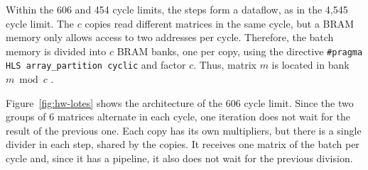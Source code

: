 Within the 606 and 454 cycle limits, the steps form a dataflow, as in the 4,545 cycle limit. The $c$ copies read different matrices in the same cycle, but a BRAM memory only allows access to two addresses per cycle. Therefore, the batch memory is divided into $c$ BRAM banks, one per copy, using the directive \texttt{\#pragma HLS array\_partition cyclic} and factor $c$. Thus, matrix $m$ is located in bank $m \bmod c$ \cite[pp.~87--88]{kastner-hls}.

Figure~\ref{fig:hw-lotes} shows the architecture of the 606 cycle limit. Since the two groups of 6 matrices alternate in each cycle, one iteration does not wait for the result of the previous one. Each copy has its own multipliers, but there is a single divider in each step, shared by the copies. It receives one matrix of the batch per cycle and, since it has a pipeline, it also does not wait for the previous division.

